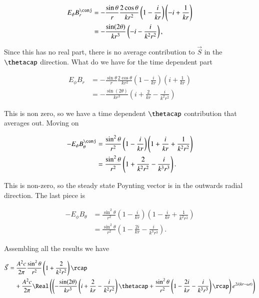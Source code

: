 \begin{align*}
E_\phi B_r^\conj &=
- \frac{\sin\theta}{r} \frac{2 \cos\theta}{k r^2} 
\left( 1 - \frac{i}{k r} \right)
\left( -i + \frac{1}{k r} \right) \\
&=
-\frac{ \sin(2\theta)}{k r^3}
\left( -i - \frac{i}{k^2 r^2} \right),
\end{align*}

Since this has no real part, there is no average contribution to $\vec{S}$ in the $\thetacap$ direction.  What do we have for the time dependent part

\begin{align*}
E_\phi B_r &=
- \frac{\sin\theta}{r} \frac{2 \cos\theta}{k r^2} 
\left( 1 - \frac{i}{k r} \right)
\left( i + \frac{1}{k r} \right) \\
&=
-\frac{ \sin(2\theta)}{k r^3}
\left( i + \frac{2}{k r} - \frac{i}{k^2 r^2} \right) 
\end{align*}

This is non zero, so we have a time dependent $\thetacap$ contribution that averages out.  Moving on

\begin{align*}
- E_\phi B_\theta^\conj
&= 
\frac{\sin^2\theta}{r^2} 
\left( 1 - \frac{i}{k r} \right)
\left( 1 + \frac{i}{k r} + \frac{1}{k^2 r^2} \right) \\
&= 
\frac{\sin^2\theta}{r^2} 
\left( 1 + \frac{2}{k^2 r^2} - \frac{i}{k^3 r^3}\right).
\end{align*}

This is non-zero, so the steady state Poynting vector is in the outwards radial direction.  The last piece is

\begin{align*}
- E_\phi B_\theta
&= 
\frac{\sin^2\theta}{r^2} 
\left( 1 - \frac{i}{k r} \right)
\left( 1 - \frac{i}{k r} + \frac{1}{k^2 r^2} \right) \\
&= 
\frac{\sin^2\theta}{r^2} 
\left( 1 - \frac{2i}{k r} - \frac{i}{k^3 r^3}\right).
\end{align*}

Assembling all the results we have

\begin{align*}
\begin{aligned}
\vec{S} 
&= 
\frac{A^2 c}{2 \pi} 
\frac{\sin^2\theta}{r^2} 
\left( 1 + \frac{2}{k^2 r^2} \right) \rcap \\
&\quad +
\frac{A^2 c}{2 \pi} 
\Real \left(
\left(
-\frac{ \sin(2\theta)}{k r^3} \left( i + \frac{2}{k r} - \frac{i}{k^2 r^2} \right) \thetacap
+\frac{\sin^2\theta}{r^2} \left( 1 - \frac{2i}{k r} - \frac{i}{k^3 r^3}\right) \rcap 
\right) e^{ 2 i ( k r - \omega t ) }
\right) 
\end{aligned}
\end{align*}

